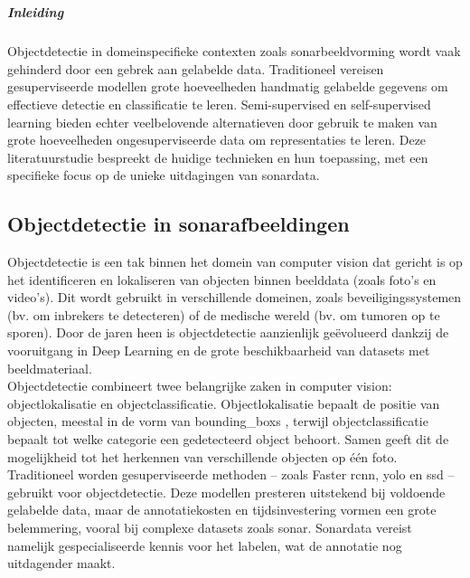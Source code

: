 \chapter{}
\label{ch:stand-van-zaken}

\paragraph{Inleiding}

Objectdetectie in domeinspecifieke contexten zoals sonarbeeldvorming wordt vaak gehinderd door een gebrek aan gelabelde data. Traditioneel vereisen gesuperviseerde modellen grote hoeveelheden handmatig gelabelde gegevens om effectieve detectie en classificatie te leren. Semi-supervised en self-supervised learning bieden echter veelbelovende alternatieven door gebruik te maken van grote hoeveelheden ongesuperviseerde data om representaties te leren. Deze literatuurstudie bespreekt de huidige technieken en hun toepassing, met een specifieke focus op de unieke uitdagingen van sonardata.

\section{Objectdetectie in sonarafbeeldingen}

Objectdetectie is een tak binnen het domein van computer vision dat gericht is op het identificeren en lokaliseren van objecten binnen beelddata (zoals foto's en video's). Dit wordt gebruikt in verschillende domeinen, zoals beveiligingssystemen (bv. om inbrekers te detecteren) of de medische wereld (bv. om tumoren op te sporen). Door de jaren heen is objectdetectie aanzienlijk geëvolueerd dankzij de vooruitgang in Deep Learning en de grote beschikbaarheid van datasets met beeldmateriaal. \autocite{He_2016} \\

Objectdetectie combineert twee belangrijke zaken in computer vision: objectlokalisatie en objectclassificatie. Objectlokalisatie bepaalt de positie van objecten, meestal in de vorm van \glspl{bounding_box} \autocite{Tompson_2015}, terwijl objectclassificatie bepaalt tot welke categorie een gedetecteerd object behoort. Samen geeft dit de mogelijkheid tot het herkennen van verschillende objecten op één foto. \\

Traditioneel worden gesuperviseerde methoden -- zoals Faster \gls{rcnn}, \gls{yolo} en \gls{ssd} -- gebruikt voor objectdetectie. \autocite{Redmon_2016} Deze modellen presteren uitstekend bij voldoende gelabelde data, maar de annotatiekosten en tijdsinvestering vormen een grote belemmering, vooral bij complexe datasets zoals sonar. Sonardata vereist namelijk gespecialiseerde kennis voor het labelen, wat de annotatie nog uitdagender maakt. \autocite{Long_2015} \\


